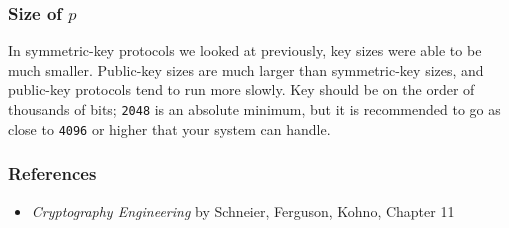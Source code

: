 \documentclass{beamer}
\newcommand{\<}{\langle}
\renewcommand{\>}{\rangle}
\begin{document}
\begin{frame}[fragile]
\frametitle{Size of $p$}

In symmetric-key protocols we looked at previously, key sizes were able to be much smaller. Public-key sizes are much larger than symmetric-key sizes, and public-key protocols tend to run more slowly. Key should be on the order of thousands of bits; \verb|2048| is an absolute minimum, but it is recommended to go as close to \verb|4096| or higher that your system can handle. 
\end{frame}


\begin{frame}
\frametitle{References}

\begin{itemize}
\item \emph{Cryptography Engineering} by Schneier, Ferguson, Kohno, Chapter 11
\end{itemize}
\end{frame}
\end{document}
